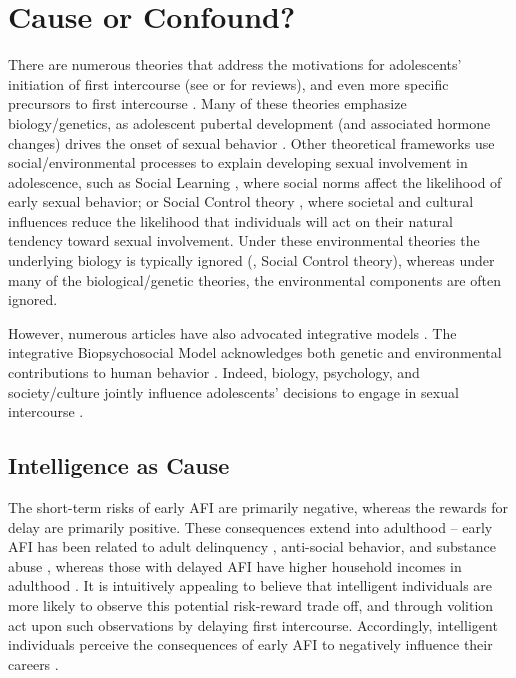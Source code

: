 \section{Cause or Confound?}
There are numerous theories that address the motivations for adolescents' initiation of first intercourse (see \citealp{Rodgers1996} or \citealp{Buhi2007} for reviews), and even more specific precursors to first intercourse \citep{Buhi2007,DOnofrio2010,kirby2002antecedents,miller1997timing,santelli1992risk}. Many of these theories emphasize biology/genetics, as adolescent pubertal development (and associated hormone changes) drives the onset of sexual behavior \citep{miller1999dopamine,udry1979age,udry1994nature}. Other theoretical frameworks use social/environmental processes to explain developing sexual involvement in adolescence, such as Social Learning \citep{diblasio1990adolescent,hogben1998using}, where social norms affect the likelihood of early sexual behavior; or Social Control theory \citep{hirschi2002causes}, where societal and cultural influences reduce the likelihood that individuals will act on their natural tendency toward sexual involvement. Under these environmental theories the underlying biology is typically ignored (\eg, Social Control theory), whereas under many of the biological/genetic theories, the environmental components are often ignored.

However, numerous articles have also advocated integrative models \citep[See][]{harden2008rethinking,harden2014genetic,udry1995sociology}. The integrative Biopsychosocial Model acknowledges both genetic and environmental contributions to human behavior \citep{Engel1977,petersen1987nature,rodgers1999nature}. Indeed, biology, psychology, and society/culture jointly influence adolescents' decisions to engage in sexual intercourse \citep{Meschke2000,zimmer2008ten}.
%
\subsection{Intelligence as Cause}
The short-term risks of early AFI are primarily negative, whereas the rewards for delay are primarily positive. These consequences extend into adulthood -- early AFI has been related to adult delinquency \citep{harden2008rethinking}, anti-social behavior, and substance abuse \citep{boislard2011individual}, whereas those with delayed AFI have higher household incomes in adulthood \citep{Harden2012}. It is intuitively appealing to believe that intelligent individuals are more likely to observe this potential risk-reward trade off, and through volition act upon such observations by delaying first intercourse. Accordingly, intelligent individuals perceive the consequences of early AFI to negatively influence their careers \citep{halpern2000smart,harden2011don}.

